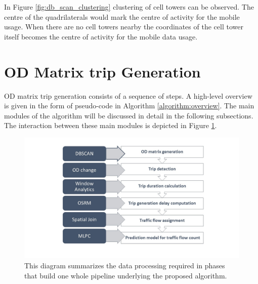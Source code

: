 \documentclass[12pt, a4paper]{report}
\theoremstyle{definition}
\theoremstyle{definition}%
\theoremstyle{definition}%
\theoremstyle{definition}%
\theoremstyle{definition}%
\theoremstyle{definition}%
\begin{document}
In Figure \ref{fig:db_scan_clustering} clustering of cell towers can be observed. The centre of the quadrilaterals would mark the centre of activity for the mobile usage. When there are no cell towers nearby the coordinates of the cell tower itself becomes the centre of activity for the mobile data usage. 



\section{OD Matrix trip Generation}  \label{section:odmatrix_trip_generation}

OD matrix trip generation consists of a sequence of steps. A high-level overview is given in the form of pseudo-code in Algorithm \ref{algorithm:overview}. The main modules of the algorithm will be discussed in detail in the following subsections. The interaction between these main modules is depicted in Figure \ref{fig:pipeline}.


\begin{figure}[!]	
	\includegraphics[scale=0.5]{pipeline.jpg}
	\centering
	\caption[Data processing pipeline]{This diagram summarizes the data processing required in phases that build one whole pipeline underlying the proposed algorithm.}
	\label{fig:pipeline}
\end{figure}
 
\end{document}
